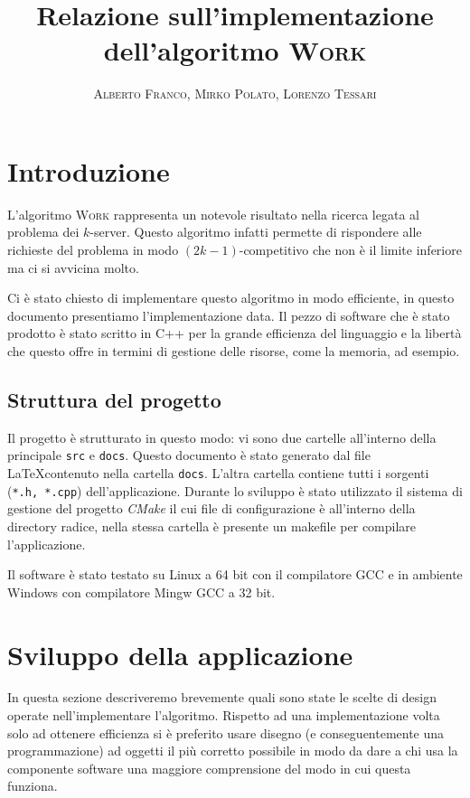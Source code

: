 \documentclass[a4paper, 10pt]{article}
\begin{document}
    \title{Relazione sull'implementazione dell'algoritmo \textsc{Work}}
    \author{\textsc{Alberto Franco, Mirko Polato, Lorenzo Tessari}}
    \maketitle

\section{Introduzione}    
L'algoritmo \textsc{Work} rappresenta un notevole risultato nella ricerca
legata al problema dei $k$-server. Questo algoritmo infatti permette di 
rispondere alle richieste del problema in modo $(2k - 1)$-competitivo che 
non è il limite inferiore ma ci si avvicina molto. 

Ci è stato chiesto di implementare questo algoritmo in modo efficiente, in 
questo documento presentiamo l'implementazione data. Il pezzo di software che 
è stato prodotto è stato scritto in C++ per la grande efficienza del 
linguaggio e la libertà che questo offre in termini di gestione delle risorse,
come la memoria, ad esempio.

\subsection{Struttura del progetto}
Il progetto è strutturato in questo modo: vi sono due cartelle all'interno della
principale \texttt{src} e \texttt{docs}. Questo documento è stato generato dal 
file \LaTeX contenuto nella cartella \texttt{docs}. L'altra cartella contiene 
tutti i sorgenti (\texttt{*.h, *.cpp}) dell'applicazione. Durante lo sviluppo
è stato utilizzato il sistema di gestione del progetto \emph{CMake} il cui
file di configurazione è all'interno della directory radice, nella stessa
cartella è presente un makefile per compilare l'applicazione. 

Il software è stato testato su Linux a 64 bit con il compilatore GCC e in 
ambiente Windows con compilatore Mingw GCC a 32 bit.

\section{Sviluppo della applicazione}
In questa sezione descriveremo brevemente quali sono state le scelte di design
operate nell'implementare l'algoritmo. Rispetto ad una implementazione volta
solo ad ottenere efficienza si è preferito usare disegno (e conseguentemente
una programmazione) ad oggetti il più corretto possibile in modo da dare 
a chi usa la componente software una maggiore comprensione del modo in cui questa
funziona. 
\end{document}
